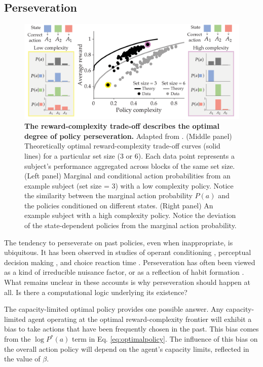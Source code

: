 \documentclass[11pt]{article}
\begin{document}
\subsection{Perseveration}

\begin{figure}
    \centering
    \includegraphics[width=450pt]{figs/gershman20.pdf}
    \caption{\textbf{The reward-complexity trade-off describes the optimal degree of policy perseveration.} Adapted from \cite{gershman20}. (Middle panel) Theoretically optimal reward-complexity trade-off curves (solid lines) for a particular set size (3 or 6). Each data point represents a subject's performance aggregated across blocks of the same set size. (Left panel) Marginal and conditional action probabilities from an example subject (set size = 3) with a low complexity policy. Notice the similarity between the marginal action probability $P(a)$ and the policies conditioned on different states. (Right panel) An example subject with a high complexity policy. Notice the deviation of the state-dependent policies from the marginal action probability.}
    \label{fig:gershman20}
\end{figure}

The tendency to perseverate on past policies, even when inappropriate, is ubiquitous. It has been observed in studies of operant conditioning \citep{thorndike11,lau05}, perceptual decision making \citep{verplanck52,howarth56,frund14}, and choice reaction time \citep{bertelson65}. Perseveration has often been viewed as a kind of irreducible nuisance factor, or as a reflection of habit formation \citep{dickinson85,miller19}. What remains unclear in these accounts is why perseveration should happen at all. Is there a computational logic underlying its existence?

The capacity-limited optimal policy provides one possible answer. Any capacity-limited agent operating at the optimal reward-complexity frontier will exhibit a bias to take actions that have been frequently chosen in the past. This bias comes from the $\log P^\ast(a)$ term in Eq. \ref{eq:optimalpolicy}. The influence of this bias on the overall action policy will depend on the agent's capacity limits, reflected in the value of $\beta$.
\end{document}
